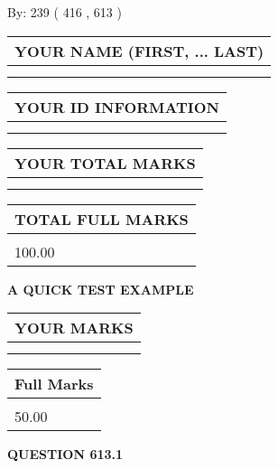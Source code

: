 \documentclass[12pt]{article}
\begin{document}
   
\hspace{1.0in} By: 
 239 ( 416 ,  613 )
   
   
   
   
\newpage 
\setcounter{page}{ 
   613001 } 
   
   
   
   
\noindent\begin{tabular}{|l|}
\hline
YOUR NAME (FIRST, ... LAST)  \\
\hline
 \\ 
 \\ 
\hline
\end{tabular}
\hspace{0.05in} \begin{tabular}{|l|}
\hline
 YOUR   ID   INFORMATION  \\
\hline
 \\ 
 \\ 
\hline
\end{tabular}
   
   
\vspace{0.2in}\noindent\begin{tabular}{|l|}
\hline
YOUR TOTAL MARKS  \\
\hline
 \\ 
 \\ 
\hline
\end{tabular}
\hspace{0.05in} \begin{tabular}{|l|}
\hline
TOTAL FULL MARKS  \\
\hline
 \\ 
100.00 \\
\hline
\end{tabular}
   
   
 \vspace{0.2in}
{\LARGE {\textbf{ A QUICK TEST EXAMPLE}}}
   
   
  
\vspace{0.2in}
  
\noindent\begin{tabular}{|l|}
\hline
 YOUR MARKS  \\
\hline
 \\ 
 \\ 
\hline
\end{tabular}
\hspace{0.05in} \begin{tabular}{|l|}
\hline
 Full Marks  \\
\hline
 \\ 
50.00 \\
\hline
\end{tabular}
{\textbf{\Large{QUESTION
613.1 
}}}
  
\end{document}
